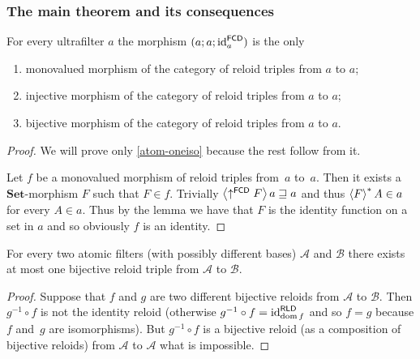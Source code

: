 \subsubsection{The main theorem and its consequences}
\begin{thm}
For every ultrafilter $a$ the morphism $(a;a;\operatorname{id}_{a}^{\mathsf{FCD}})$
is the only
\begin{enumerate}
\item \label{atom-oneiso}monovalued morphism of the category of reloid
triples from $a$ to $a$;
\item injective morphism of the category of reloid triples from $a$ to
$a$;
\item bijective morphism of the category of reloid triples from $a$ to
$a$.
\end{enumerate}
\end{thm}
\begin{proof}
We will prove only \ref{atom-oneiso} because the rest follow from
it.

Let $f$ be a monovalued morphism of reloid triples from~$a$ to~$a$.
Then it exists a $\mathbf{Set}$-morphism $F$ such that $F\in f$.
Trivially $\left\langle \uparrow^{\mathsf{FCD}}F\right\rangle a\sqsupseteq a$ and thus
$\left\langle F\right\rangle ^{\ast}A\in a$ for every $A\in a$. Thus by the lemma we have
that $F$ is the identity function on a set in $a$ and so obviously
$f$ is an identity.\end{proof}
\begin{cor}
For every two atomic filters (with possibly different bases) $\mathcal{A}$
and $\mathcal{B}$ there exists at most one bijective reloid triple
from $\mathcal{A}$ to $\mathcal{B}$.\end{cor}
\begin{proof}
Suppose that $f$ and $g$ are two different bijective reloids from
$\mathcal{A}$ to $\mathcal{B}$. Then $g^{-1}\circ f$ is not the
identity reloid (otherwise $g^{-1}\circ f=\operatorname{id}_{\operatorname{dom} f}^{\mathsf{RLD}}$
and so $f=g$ because $f$ and~$g$ are isomorphisms). But $g^{-1}\circ f$ is a bijective reloid (as a composition
of bijective reloids) from $\mathcal{A}$ to $\mathcal{A}$ what is
impossible.
\end{proof}

